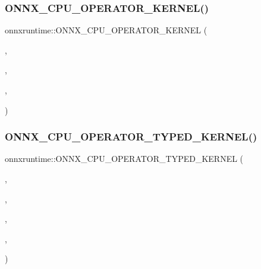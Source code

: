 \subsubsection{\texorpdfstring{O\+N\+N\+X\+\_\+\+C\+P\+U\+\_\+\+O\+P\+E\+R\+A\+T\+O\+R\+\_\+\+K\+E\+R\+N\+E\+L()}{ONNX\_CPU\_OPERATOR\_KERNEL()}\hspace{0.1cm}{\footnotesize\ttfamily [72/72]}}
{\footnotesize\ttfamily onnxruntime\+::\+O\+N\+N\+X\+\_\+\+C\+P\+U\+\_\+\+O\+P\+E\+R\+A\+T\+O\+R\+\_\+\+K\+E\+R\+N\+EL (\begin{DoxyParamCaption}\item[{\mbox{\hyperlink{classonnxruntime_1_1Atan}{Atan}}}]{,  }\item[{7}]{,  }\item[{\mbox{\hyperlink{classonnxruntime_1_1KernelDefBuilder}{Kernel\+Def\+Builder}}().Type\+Constraint(\char`\"{}T\char`\"{}, Data\+Type\+Impl\+::\+Get\+Tensor\+Type$<$ float $>$())}]{,  }\item[{\mbox{\hyperlink{classonnxruntime_1_1Atan}{Atan}}$<$ float $>$}]{ }\end{DoxyParamCaption})}

\mbox{\label{namespaceonnxruntime_a090d6b31bfd9b6b3764e30847321acab}} 
\subsubsection{\texorpdfstring{O\+N\+N\+X\+\_\+\+C\+P\+U\+\_\+\+O\+P\+E\+R\+A\+T\+O\+R\+\_\+\+T\+Y\+P\+E\+D\+\_\+\+K\+E\+R\+N\+E\+L()}{ONNX\_CPU\_OPERATOR\_TYPED\_KERNEL()}\hspace{0.1cm}{\footnotesize\ttfamily [1/25]}}
{\footnotesize\ttfamily onnxruntime\+::\+O\+N\+N\+X\+\_\+\+C\+P\+U\+\_\+\+O\+P\+E\+R\+A\+T\+O\+R\+\_\+\+T\+Y\+P\+E\+D\+\_\+\+K\+E\+R\+N\+EL (\begin{DoxyParamCaption}\item[{\mbox{\hyperlink{classonnxruntime_1_1Add}{Add}}}]{,  }\item[{7}]{,  }\item[{float}]{,  }\item[{\mbox{\hyperlink{classonnxruntime_1_1KernelDefBuilder}{Kernel\+Def\+Builder}}().Type\+Constraint(\char`\"{}T\char`\"{}, Data\+Type\+Impl\+::\+Get\+Tensor\+Type$<$ float $>$())}]{,  }\item[{\mbox{\hyperlink{classonnxruntime_1_1Add}{Add}}$<$ float $>$}]{ }\end{DoxyParamCaption})}

